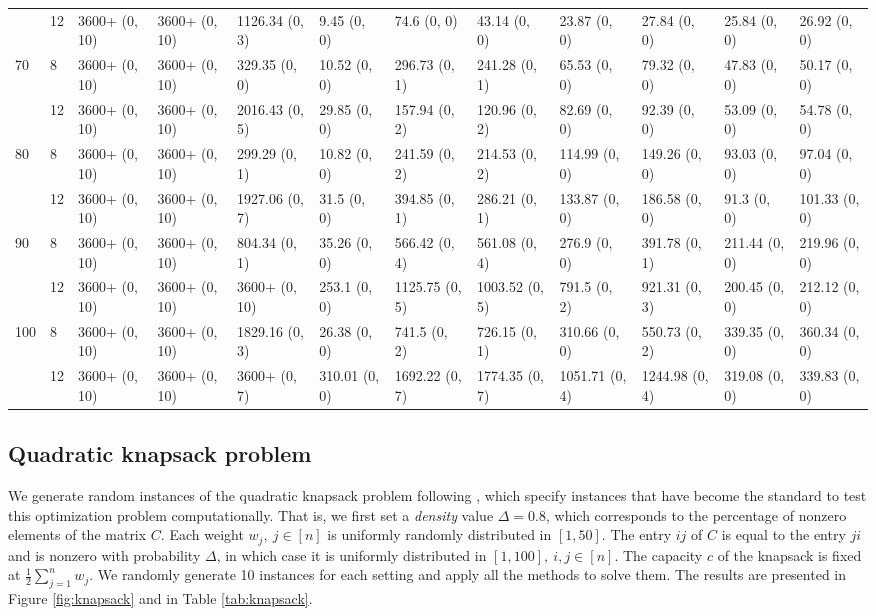 \documentclass{article}
\begin{document}
\begin{table}
{\begin{tabular}{llllllllllll}
 & 12 & 3600+ (0, 10) & 3600+ (0, 10) & 1126.34 (0, 3) & 9.45 (0, 0) & 74.6 (0, 0) & 43.14 (0, 0) & 23.87 (0, 0) & 27.84 (0, 0) & 25.84 (0, 0) & 26.92 (0, 0) \\
\cline{1-12}
\multirow[t]{2}{*}{70} & 8 & 3600+ (0, 10) & 3600+ (0, 10) & 329.35 (0, 0) & 10.52 (0, 0) & 296.73 (0, 1) & 241.28 (0, 1) & 65.53 (0, 0) & 79.32 (0, 0) & 47.83 (0, 0) & 50.17 (0, 0) \\
 & 12 & 3600+ (0, 10) & 3600+ (0, 10) & 2016.43 (0, 5) & 29.85 (0, 0) & 157.94 (0, 2) & 120.96 (0, 2) & 82.69 (0, 0) & 92.39 (0, 0) & 53.09 (0, 0) & 54.78 (0, 0) \\
\cline{1-12}
\multirow[t]{2}{*}{80} & 8 & 3600+ (0, 10) & 3600+ (0, 10) & 299.29 (0, 1) & 10.82 (0, 0) & 241.59 (0, 2) & 214.53 (0, 2) & 114.99 (0, 0) & 149.26 (0, 0) & 93.03 (0, 0) & 97.04 (0, 0) \\
 & 12 & 3600+ (0, 10) & 3600+ (0, 10) & 1927.06 (0, 7) & 31.5 (0, 0) & 394.85 (0, 1) & 286.21 (0, 1) & 133.87 (0, 0) & 186.58 (0, 0) & 91.3 (0, 0) & 101.33 (0, 0) \\
\cline{1-12}
\multirow[t]{2}{*}{90} & 8 & 3600+ (0, 10) & 3600+ (0, 10) & 804.34 (0, 1) & 35.26 (0, 0) & 566.42 (0, 4) & 561.08 (0, 4) & 276.9 (0, 0) & 391.78 (0, 1) & 211.44 (0, 0) & 219.96 (0, 0) \\
 & 12 & 3600+ (0, 10) & 3600+ (0, 10) & 3600+ (0, 10) & 253.1 (0, 0) & 1125.75 (0, 5) & 1003.52 (0, 5) & 791.5 (0, 2) & 921.31 (0, 3) & 200.45 (0, 0) & 212.12 (0, 0) \\
\cline{1-12}
\multirow[t]{2}{*}{100} & 8 & 3600+ (0, 10) & 3600+ (0, 10) & 1829.16 (0, 3) & 26.38 (0, 0) & 741.5 (0, 2) & 726.15 (0, 1) & 310.66 (0, 0) & 550.73 (0, 2) & 339.35 (0, 0) & 360.34 (0, 0) \\
 & 12 & 3600+ (0, 10) & 3600+ (0, 10) & 3600+ (0, 7) & 310.01 (0, 0) & 1692.22 (0, 7) & 1774.35 (0, 7) & 1051.71 (0, 4) & 1244.98 (0, 4) & 319.08 (0, 0) & 339.83 (0, 0) \\
\cline{1-12}
\bottomrule
\end{tabular}}
\end{table}



\subsection{Quadratic knapsack problem}

We generate random instances of the quadratic knapsack problem following \cite{pisinger2007quadratic}, which specify instances that have become the standard to test this optimization problem computationally. That is, we first set a \emph{density} value $\Delta = 0.8$, which corresponds to the percentage of nonzero elements of the matrix $C$. Each weight $w_j , \ j \in [n]$ is uniformly randomly distributed in $[1,50]$. The entry $ij$ of $C$ is equal to the entry $ji$ and is nonzero with probability $\Delta$, in which case it is uniformly distributed in $[1,100], \ i,j \in [n]$. The capacity $c$ of the knapsack is fixed at $\frac{1}{2}\sum_{j=1}^n w_j$. We randomly generate 10 instances for each setting and apply all the methods to solve them. The results are presented in Figure \ref{fig:knapsack} and in Table \ref{tab:knapsack}.
\end{document}
